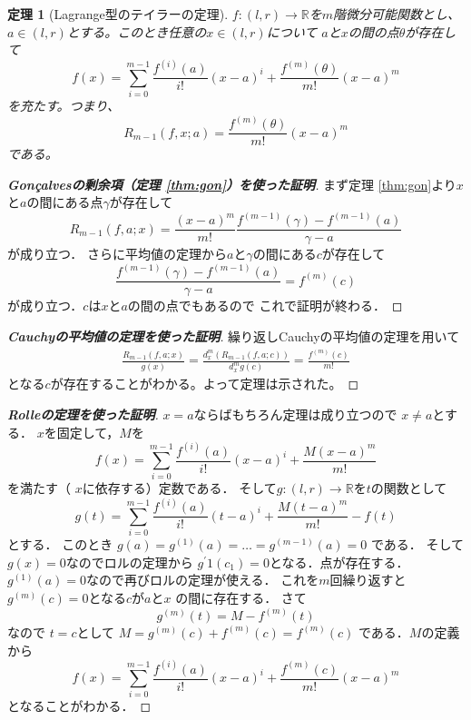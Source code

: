 \documentclass[leqno, a4paper, 12pt]{jsarticle}
\newtheorem{thm}{定理}
\newcommand{\rr}{\mathbb{R}}
\newcommand{\bibun}[1]{#1^{\prime}}
\newcommand{\bbb}[2]{#1^{(#2)}}
\begin{document}
\begin{thm}[Lagrange型のテイラーの定理]
$f:(l,r)\to \rr$を$m$階微分可能関数とし、$a\in (l,r)$とする。このとき任意の$x\in (l,r)$について
$a$と$x$の間の点$\theta$が存在して
\[
f(x)=\sum_{i=0}^{m-1}\frac{f^{(i)}(a)}{i!}(x-a)^i+\frac{f^{(m)}(\theta)}{m!}(x-a)^m
\]
を充たす。つまり、
\[
R_{m-1}(f, x;a)=\frac{f^{(m)}(\theta)}{m!}(x-a)^m
\]
である。
\end{thm}
\begin{proof}[\textbf{Gon\c{c}alvesの剰余項（定理 \ref{thm:gon}）を使った証明}]
まず定理 \ref{thm:gon}より$x$と$a$の間にある点$\gamma$が存在して
\[
R_{m-1}(f, a; x)=\frac{(x-a)^{m}}{m!}\frac{\bbb{f}{m-1}(\gamma)-\bbb{f}{m-1}(a)}{\gamma-a}
\]
が成り立つ．
さらに平均値の定理から$a$と$\gamma$の間にある$c$が存在して
\[
\frac{\bbb{f}{m-1}(\gamma)-\bbb{f}{m-1}(a)}{\gamma-a}
=\bbb{f}{m}(c)
\]
が成り立つ．$c$は$x$と$a$の間の点でもあるので
これで証明が終わる．
\end{proof}
\begin{proof}[\textbf{Cauchyの平均値の定理を使った証明}]
繰り返しCauchyの平均値の定理を用いて
\begin{align*}
\frac{R_{m-1}(f, a; x)}{g(x)}=
\frac{d_x^{m}(R_{m-1}(f, a; c))}{d_x^{m}g(c)}=
\frac{f^{(m)}(c)}{m!}
\end{align*}
となる$c$が存在することがわかる。よって定理は示された。
\end{proof}
\begin{proof}[\textbf{Rolleの定理を使った証明}]
$x=a$ならばもちろん定理は成り立つので
$x\neq a$とする．
$x$を固定して，$M$を
\[
f(x)=\sum_{i=0}^{m-1}\frac{\bbb{f}{i}(a)}{i!}(x-a)^{i}
+\frac{M(x-a)^{m}}{m!}
\]
を満たす（ $x$に依存する）定数である．
そして$g: (l, r)\to \rr$を$t$の関数として
\[
g(t)=\sum_{i=0}^{m-1}\frac{\bbb{f}{i}(a)}{i!}(t-a)^{i}
+\frac{M(t-a)^{m}}{m!}
-f(t)
\]
とする．
このとき
$g(a)=\bbb{g}{1}(a)=\dots =\bbb{g}{m-1}(a)=0$
である．
そして$g(x)=0$なのでロルの定理から
$\bibun{g}{1}(c_{1})=0$となる．点が存在する．
$\bbb{g}{1}(a)=0$なので再びロルの定理が使える．
これを$m$回繰り返すと$\bbb{g}{m}(c)=0$となる$c$が$a$と$x$
の間に存在する．
さて
\[
\bbb{g}{m}(t)=M-\bbb{f}{m}(t)
\]
なので
$t=c$として
$M=\bbb{g}{m}(c)+\bbb{f}{m}(c)=\bbb{f}{m}(c)$
である．$M$の定義から
\[
f(x)=\sum_{i=0}^{m-1}\frac{\bbb{f}{i}(a)}{i!}(x-a)^{i}
+\frac{\bbb{f}{m}(c)}{m!}(x-a)^{m}
\]
となることがわかる．
\end{proof}
\end{document}
